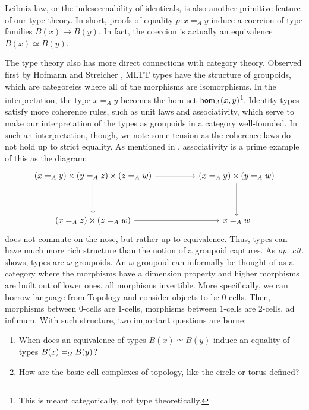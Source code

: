 \documentclass[main.tex]{subfiles}
\begin{document}
Leibniz law, or the indescernability of identicals, is also another primitive feature of our type theory. In short, proofs of equality $p : x =_A y$ induce a coercion of type families $B(x) \to B(y)$. In fact, the coercion is actually an equivalence $B(x) \simeq B(y)$. 

The type theory also has more direct connections with category theory. Observed first by Hofmann and Streicher \cite{hofmann1998groupoid}, MLTT types have the structure of groupoids, which are categoreies where all of the morphisms are isomorphisms. In the interpretation, the type $x=_A y$ becomes the hom-set $\ho[A]{x}{y}$\footnote{This is meant categorically, not type theoretically.}. Identity types satisfy more coherence rules, such as unit laws and associativity, which serve to make our interpretation of the types as groupoids in a category well-founded. In such an interpretation, though, we note some tension as the coherence laws do not hold up to strict equality. As mentioned in \cite{berg_garner_richard}, associativity is a prime example of this as the diagram:
\[\begin{tikzcd}
	{(x=_A y) \times( y =_A z) \times (z =_A w)} && {(x=_A y) \times (y=_Aw)} \\
	\\
	{(x =_A z )\times (z =_A w)} && {x=_A w}
	\arrow[from=1-1, to=1-3]
	\arrow[from=1-1, to=3-1]
	\arrow[from=1-3, to=3-3]
	\arrow[from=3-1, to=3-3]
\end{tikzcd}\]
does not commute on the nose, but rather up to equivalence. Thus, types can have much more rich structure than the notion of a groupoid captures. As \textit{op. cit.} shows, types are $\omega$-groupoids. An $\omega$-groupoid can informally be thought of as a category where the morphisms have a dimension property and higher morphisms are built out of lower ones, all morphisms invertible. More specifically, we can borrow language from Topology and consider objects to be $0$-cells. Then, morphisms between $0$-cells are $1$-cells, morphisms between $1$-cells are $2$-cells, ad infimum. With such structure, two important questions are borne: 
\begin{enumerate}
  \item When does an equivalence of types $B(x) \simeq B(y)$ induce an equality of types $B(x)=_{\U} B(y)$?
  \item How are the basic cell-complexes of topology, like the circle or torus defined?
\end{enumerate}
\end{document}
